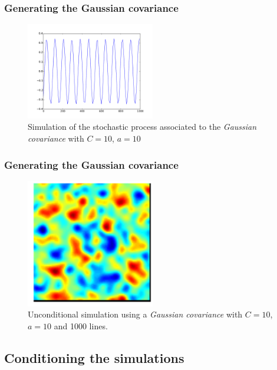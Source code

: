 \documentclass{beamer}
\begin{document}
\begin{frame}
 \frametitle{Generating the Gaussian covariance}
 
\begin{figure}
\begin{center}
\includegraphics[width=0.5\textwidth]{sthocastic_simulation_gaussian.pdf}
\end{center}
\caption{Simulation of the stochastic process associated to the \textit{Gaussian covariance} with $C = 10$, $a = 10$}
\label{fig:sthoc_gauss_simulation}
\end{figure}
\end{frame}

\begin{frame}
 \frametitle{Generating the Gaussian covariance}
 
\begin{figure}
\begin{center}
\includegraphics[width=0.5\textwidth]{gaussian_simulation_a=10_C=10.pdf}
\end{center}
\caption{Unconditional simulation using a \textit{Gaussian covariance} with $C = 10$, $a = 10$ and 1000 lines.}
\label{fig:gaussian_unc_simulation}
\end{figure}
\end{frame}


\subsection{Conditioning the simulations}
\end{document}
